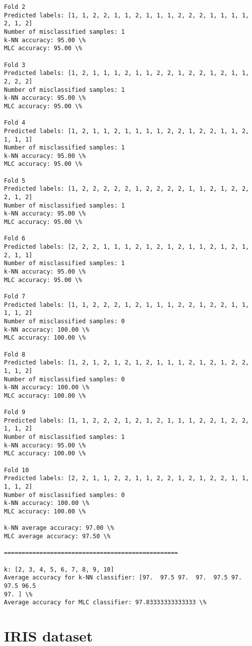 \documentclass[11pt]{article}
\begin{document}
\begin{Verbatim}[commandchars=\\\{\}]
Fold 2
Predicted labels: [1, 1, 2, 2, 1, 1, 2, 1, 1, 1, 2, 2, 2, 1, 1, 1, 1, 2, 1, 2]
Number of misclassified samples: 1
k-NN accuracy: 95.00 \%
MLC accuracy: 95.00 \%

Fold 3
Predicted labels: [1, 2, 1, 1, 1, 2, 1, 1, 2, 2, 1, 2, 2, 1, 2, 1, 1, 2, 2, 2]
Number of misclassified samples: 1
k-NN accuracy: 95.00 \%
MLC accuracy: 95.00 \%

Fold 4
Predicted labels: [1, 2, 1, 1, 2, 1, 1, 1, 1, 2, 2, 1, 2, 2, 1, 1, 2, 1, 1, 1]
Number of misclassified samples: 1
k-NN accuracy: 95.00 \%
MLC accuracy: 95.00 \%

Fold 5
Predicted labels: [1, 2, 2, 2, 2, 2, 1, 2, 2, 2, 2, 1, 1, 2, 1, 2, 2, 2, 1, 2]
Number of misclassified samples: 1
k-NN accuracy: 95.00 \%
MLC accuracy: 95.00 \%

Fold 6
Predicted labels: [2, 2, 2, 1, 1, 1, 2, 1, 2, 1, 2, 1, 1, 2, 1, 2, 1, 2, 1, 1]
Number of misclassified samples: 1
k-NN accuracy: 95.00 \%
MLC accuracy: 95.00 \%

Fold 7
Predicted labels: [1, 1, 2, 2, 2, 1, 2, 1, 1, 1, 2, 2, 1, 2, 2, 1, 1, 1, 1, 2]
Number of misclassified samples: 0
k-NN accuracy: 100.00 \%
MLC accuracy: 100.00 \%

Fold 8
Predicted labels: [1, 2, 1, 2, 1, 2, 1, 2, 1, 1, 1, 2, 1, 2, 1, 2, 2, 1, 1, 2]
Number of misclassified samples: 0
k-NN accuracy: 100.00 \%
MLC accuracy: 100.00 \%

Fold 9
Predicted labels: [1, 1, 2, 2, 2, 1, 2, 1, 2, 1, 1, 1, 2, 2, 1, 2, 2, 1, 1, 2]
Number of misclassified samples: 1
k-NN accuracy: 95.00 \%
MLC accuracy: 100.00 \%

Fold 10
Predicted labels: [2, 2, 1, 1, 2, 2, 1, 1, 2, 2, 1, 2, 1, 2, 2, 1, 1, 1, 1, 2]
Number of misclassified samples: 0
k-NN accuracy: 100.00 \%
MLC accuracy: 100.00 \%

k-NN average accuracy: 97.00 \%
MLC average accuracy: 97.50 \%

=================================================

k: [2, 3, 4, 5, 6, 7, 8, 9, 10]
Average accuracy for k-NN classifier: [97.  97.5 97.  97.  97.5 97.  97.5 96.5
97. ] \%
Average accuracy for MLC classifier: 97.83333333333333 \%

    \end{Verbatim}

    \hypertarget{iris-dataset}{%
\section{IRIS dataset}\label{iris-dataset}}
\end{document}
